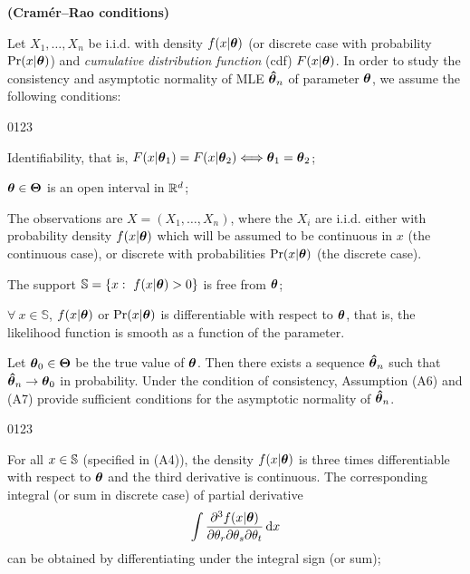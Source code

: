 \begin{theorem} \label{thm2} {\bf (Cram\'er--Rao conditions)} \\
    {\rm
    Let $X_1, \ldots, X_n$ be i.i.d. \trv with density $f(x|{\boldsymbol{\theta}})$ (or discrete case with probability $\mbox{Pr}(x|{\boldsymbol{\theta}})$) and \textit{cumulative distribution function} (cdf) $F(x|{\boldsymbol{\theta}})$. In order to study the consistency and asymptotic normality of MLE $\boldsymbol{\hat{\theta}}_n$ of parameter ${\boldsymbol{\theta}}$, we assume the following conditions:
    \begin{namelist}{0123}
                \item[\hspace*{-0.05cm} (A1)]   Identifiability, that is, $F(x|{\boldsymbol{\theta}}_1) = F(x|{\boldsymbol{\theta}}_2) \Longleftrightarrow {\boldsymbol{\theta}}_1 = {\boldsymbol{\theta}}_2$;

                \item[\hspace*{-0.05cm} (A2)]   ${\boldsymbol{\theta}}\in{\boldsymbol{\Theta}}$ is an open interval in ${\mathbb{R}}^{d}$;

                \item[\hspace*{-0.05cm} (A3)]   The observations are $X = (X_1,\ldots,X_n)$, where the $X_i$ are i.i.d. either with probability density $f(x|{\boldsymbol{\theta}})$ which will be assumed to be continuous in $x$ (the continuous case), or discrete with probabilities $\Pr(x|{\boldsymbol{\theta}})$ (the discrete case).

                \item[\hspace*{-0.05cm} (A4)]   The support $\mathbb{S} = \{x: \ f(x|{\boldsymbol{\theta}}) > 0\}$ is free from ${\boldsymbol{\theta}}$;

                \item[\hspace*{-0.05cm} (A5)]   $\forall \ x \in \mathbb{S}$, $f(x|{\boldsymbol{\theta}})$ or $\Pr(x|{\boldsymbol{\theta}})$ is differentiable with respect to ${\boldsymbol{\theta}}$, that is, the likelihood function is smooth as a function of the parameter.
    \end{namelist}
    Let ${\boldsymbol{\theta}}_0 \in {\boldsymbol{\Theta}}$ be the true value of ${\boldsymbol{\theta}}$. Then there exists a sequence $\boldsymbol{\hat{\theta}}_n$ such that $\boldsymbol{\hat{\theta}}_n \rightarrow {\boldsymbol{\theta}}_0$ in probability. Under the condition of consistency, Assumption (A6) and (A7) provide sufficient conditions for the asymptotic normality of $\boldsymbol{\hat{\theta}}_n$.
    \begin{namelist}{0123}
                \item[\hspace*{-0.05cm} (A6)]   For all $x \in {\mathbb{S}}$ (specified in (A4)), the density $f(x|{\boldsymbol{\theta}})$ is three times differentiable with respect to ${\boldsymbol{\theta}}$ and the third derivative is continuous. The corresponding integral (or sum in discrete case) of partial derivative
                $$
                    \int \frac{\partial^3 f(x|{\boldsymbol{\theta}})}{\partial\theta_r \partial\theta_s \partial\theta_t} \,\mbox{d} x
                $$
                can be obtained by differentiating under the integral sign (or sum);


\end{namelist}}
\end{theorem}
